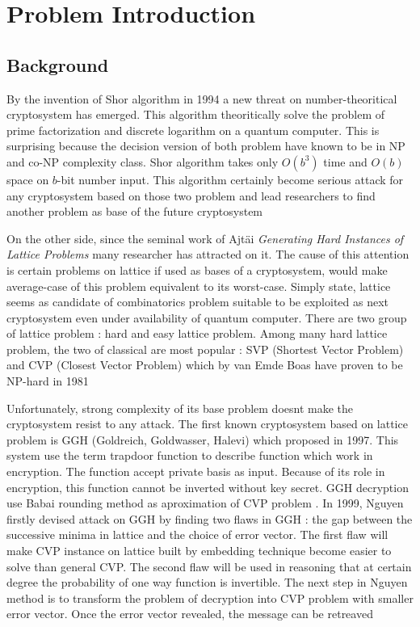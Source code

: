 \chapter{Problem Introduction}
\section{Background}
\par
By the invention of Shor algorithm in 1994 a new threat on number-theoritical cryptosystem has emerged. This algorithm theoritically solve the problem of prime factorization and discrete logarithm on a quantum computer. This is surprising because the decision version of both problem have known to be in NP and co-NP complexity class. Shor algorithm takes only $ O(b^3)$ time and $ O(b)$ space on $b$-bit number input. This algorithm certainly become serious attack for any cryptosystem based on those two problem and lead researchers to find another problem as base of the future cryptosystem

On the other side, since the seminal work of Ajt\"{a}i \textsl{Generating Hard Instances of Lattice Problems} many researcher has attracted on it. The cause of this attention is certain problems on lattice if used as bases of a cryptosystem, would make average-case of this problem equivalent to its worst-case. Simply state, lattice seems as candidate of combinatorics problem suitable to be exploited as next cryptosystem even under availability of quantum computer. There are two group of lattice problem : hard and easy lattice problem. Among many hard lattice problem, the two of classical are most popular : SVP (Shortest Vector Problem) and CVP (Closest Vector Problem) which by van Emde Boas have proven to be NP-hard in 1981 \cite{Ros11}

Unfortunately, strong complexity of its base problem doesnt make the cryptosystem resist to any attack. The first known cryptosystem based on lattice problem is GGH (Goldreich, Goldwasser, Halevi) which proposed in 1997. This system use the term trapdoor function to describe function which work in encryption. The function accept private basis as input. Because of its role in encryption, this function cannot be inverted without key secret. GGH decryption use Babai rounding method as aproximation of CVP problem \cite{Ggh97}. In 1999, Nguyen firstly devised attack on GGH by finding two flaws in GGH : the gap between the successive minima in lattice and the choice of error vector. The first flaw will make CVP instance on lattice built by embedding technique become easier to solve than general CVP. The second flaw will be used in reasoning that at certain degree the probability of one way function is invertible. The next step in Nguyen method is to transform the problem of decryption into CVP problem with smaller error vector. Once the error vector revealed, the message can be retreaved \cite{Ngu99}

